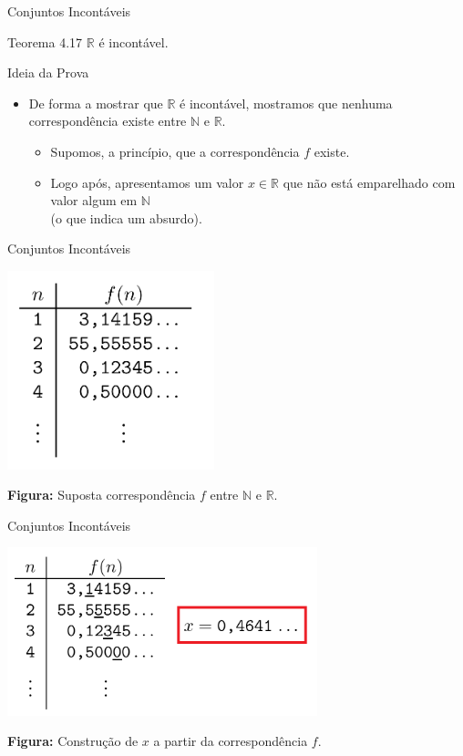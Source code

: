 \documentclass[xcolor=dvipsnames,table]{beamer}
\begin{document}
	\begin{frame}{Conjuntos Incontáveis}
		\begin{block}{Teorema 4.17}
			$\mathbb{R}$ é incontável.
		\end{block} \pause
		\begin{block}{Ideia da Prova}
			\begin{itemize}
				\item De forma a mostrar que $\mathbb{R}$ é incontável, mostramos que nenhuma correspondência existe entre $\mathbb{N}$ e $\mathbb{R}$.
				\begin{itemize}
					\item Supomos, a princípio, que a correspondência $f$ existe.
					\item Logo após, apresentamos um valor $x \in \mathbb{R}$ que não está emparelhado com valor algum em $\mathbb{N}$ \\(o que indica um absurdo).				
				\end{itemize}
			\end{itemize}
		\end{block}
	\end{frame}
	
	\begin{frame}{Conjuntos Incontáveis}
		\begin{center}
			\includegraphics[width=6cm]{images/fHip.png}
			
			{\bf Figura:} Suposta correspondência $f$ entre $\mathbb{N}$ e $\mathbb{R}$.
		\end{center}
	\end{frame}
	
	\begin{frame}{Conjuntos Incontáveis}
		\begin{center}
			\includegraphics[width=9cm]{images/fHipX.png}
			
			{\bf Figura:} Construção de $x$ a partir da correspondência $f$.
		\end{center}
	\end{frame}
	
\end{document}
